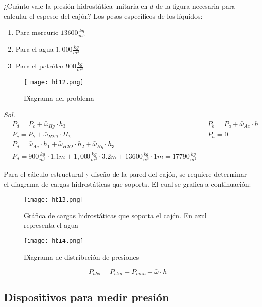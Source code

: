 \begin{example}
    ¿Cuánto vale la presión hidrostática unitaria en $d$ de la figura necesaria para calcular el espesor del cajón? Los pesos específicos de los líquidos:
    \begin{enumerate}
        \item Para mercurio $13600\frac{kg}{m^3}$
        \item Para el agua $1,000\frac{kg}{m^3}$
        \item Para el petróleo $900\frac{kg}{m^3}$
    \end{enumerate}
\end{example}

\begin{figure}[h!]
  \centerline{\texttt{[image: hb12.png]}}
  \caption{Diagrama del problema}
  \label{hb12}
\end{figure}

\textit{ Sol. }
\begin{align*}
    &P_d=P_c+\bar{\omega}_{Hg}\cdot h_3&&P_b=P_a+\bar{\omega}_{Ac}\cdot h\\
    &P_c=P_b+\bar{\omega}_{H2O}\cdot H_2&& P_a=0\\
    &P_d=\bar{\omega}_{Ac}\cdot h_1+\bar{\omega}_{H2O}\cdot h_2+\bar{\omega}_{Hg}\cdot h_3\\
    &P_d=900\frac{kg}{m^3}\cdot 1.1m+1,000\frac{kg}{m^3}\cdot 3.2m+13600\frac{kg}{m^3}\cdot 1m=17790\frac{kg}{m^2}
\end{align*}

Para el cálculo estructural y diseño de la pared del cajón, se requiere determinar el diagrama de cargas hidrostáticas que soporta. El cual se grafica a continuación:

\begin{figure}[h!]
  \centerline{\texttt{[image: hb13.png]}}
  \caption{Gráfica de cargas hidrostáticas que soporta el cajón. En azul representa el agua}
  \label{hb13}
\end{figure}

\begin{figure}[h!]
  \centerline{\texttt{[image: hb14.png]}}
  \caption{Diagrama de distribución de presiones}
  \label{hb14}
\end{figure}

\begin{equation}
    P_{abs}=P_{atm}+P_{man}+\bar{\omega}\cdot h
\end{equation}

\subsection{Dispositivos para medir presión}

